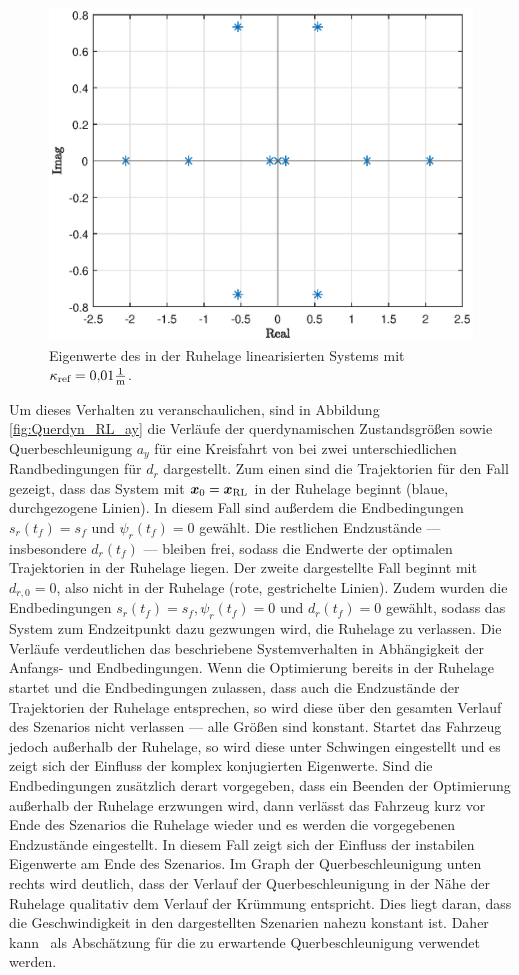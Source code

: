 \begin{figure}[h] 
	\centering
	\includegraphics[width=0.7\linewidth]{./Bilder/Ergebnisse/Kreisfahrt/Mit_Querdynamik/EW_linear_Kreisfahrt.eps}
	\caption{Eigenwerte des in der Ruhelage linearisierten Systems mit $\kappa_{\textrm{ref}} = 0{,}01\frac{1}{\mathrm{m}}$.}
	\label{fig:EW_linear_Kreisfahrt}
\end{figure} 
Um dieses Verhalten zu veranschaulichen, sind in Abbildung \ref{fig:Querdyn_RL_ay} die Verläufe der querdynamischen Zustandsgrößen sowie Querbeschleunigung $a_y$ für eine Kreisfahrt von  bei zwei unterschiedlichen Randbedingungen für $d_r$ dargestellt. Zum einen sind die Trajektorien für den Fall gezeigt, dass das System mit $\boldsymbol{x}_0 = \boldsymbol{x}_{\textrm{RL}}$ in der Ruhelage beginnt (blaue, durchgezogene Linien). In diesem Fall sind außerdem die Endbedingungen $s_r(t_f) = s_f$ und $\psi_r(t_f) = 0$ gewählt. Die restlichen Endzustände --- insbesondere $d_r(t_f)$ --- bleiben frei, sodass die Endwerte der optimalen Trajektorien in der Ruhelage liegen. Der zweite dargestellte Fall beginnt mit $d_{r,0} = 0$, also nicht in der Ruhelage (rote, gestrichelte Linien). Zudem wurden die Endbedingungen $s_r(t_f) = s_f, \psi_r(t_f) = 0$ und $d_r(t_f) = 0$ gewählt, sodass das System zum Endzeitpunkt dazu gezwungen wird, die Ruhelage zu verlassen. Die Verläufe verdeutlichen das beschriebene Systemverhalten in Abhängigkeit der Anfangs- und Endbedingungen. Wenn die Optimierung bereits in der Ruhelage startet und die Endbedingungen zulassen, dass auch die Endzustände der Trajektorien der Ruhelage entsprechen, so wird diese über den gesamten Verlauf des Szenarios nicht verlassen ---  alle Größen sind konstant. Startet das Fahrzeug jedoch außerhalb der Ruhelage, so wird diese unter Schwingen eingestellt und es zeigt sich der Einfluss der komplex konjugierten Eigenwerte. Sind die Endbedingungen zusätzlich derart vorgegeben, dass ein Beenden der Optimierung außerhalb der Ruhelage erzwungen wird, dann verlässt das Fahrzeug kurz vor Ende des Szenarios die Ruhelage wieder und es werden die vorgegebenen Endzustände eingestellt. In diesem Fall zeigt sich der Einfluss der instabilen Eigenwerte am Ende des Szenarios. Im Graph der Querbeschleunigung unten rechts wird deutlich, dass der Verlauf der Querbeschleunigung in der Nähe der Ruhelage qualitativ dem Verlauf der Krümmung entspricht. Dies liegt daran, dass die Geschwindigkeit in den dargestellten Szenarien nahezu konstant ist. Daher kann \ayRL~als Abschätzung für die zu erwartende Querbeschleunigung verwendet werden. 
